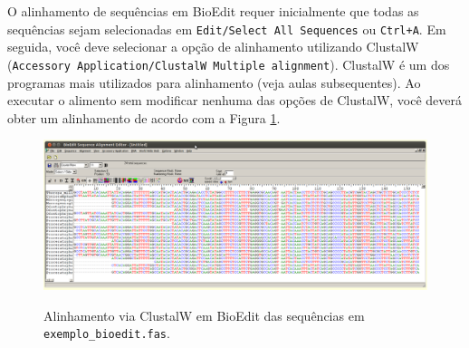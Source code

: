 \begin{refsection}

O alinhamento de sequências em BioEdit requer inicialmente que todas as sequências sejam selecionadas em \texttt{Edit/Select All Sequences} ou \texttt{Ctrl+A}. Em seguida, você deve selecionar a opção de alinhamento utilizando ClustalW (\texttt{Accessory Application/ClustalW Multiple alignment}). ClustalW \parencite{Larkin_et_al_2007} é um dos programas mais utilizados para alinhamento (veja aulas subsequentes). Ao executar o alimento sem modificar nenhuma das opções de ClustalW, você deverá obter um alinhamento de acordo com a Figura \ref{tut7:fig:bioedit_aligned}.\\

  \begin{figure}[h!]
       \centering
      {\includegraphics[scale=0.3]{figures/tut7/bioedit_aligned.eps}}
	{\caption[Bioedit: alinhamento]{Alinhamento via ClustalW em BioEdit das sequências em \texttt{exemplo\_bioedit.fas}.}\label{tut7:fig:bioedit_aligned}}
  \end{figure}



\end{refsection}
